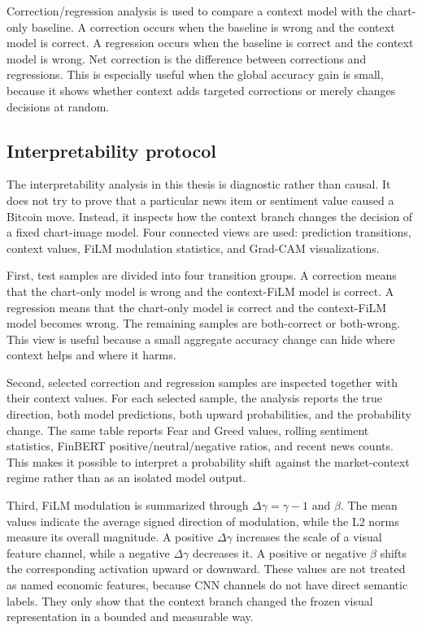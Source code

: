 \documentclass[14pt,a4paper]{extarticle}
\begin{document}
Correction/regression analysis is used to compare a context model with the chart-only baseline. A correction occurs when the baseline is wrong and the context model is correct. A regression occurs when the baseline is correct and the context model is wrong. Net correction is the difference between corrections and regressions. This is especially useful when the global accuracy gain is small, because it shows whether context adds targeted corrections or merely changes decisions at random.

\clearpage
\subsection{Interpretability protocol}

The interpretability analysis in this thesis is diagnostic rather than causal. It does not try to prove that a particular news item or sentiment value caused a Bitcoin move. Instead, it inspects how the context branch changes the decision of a fixed chart-image model. Four connected views are used: prediction transitions, context values, FiLM modulation statistics, and Grad-CAM visualizations.

First, test samples are divided into four transition groups. A correction means that the chart-only model is wrong and the context-FiLM model is correct. A regression means that the chart-only model is correct and the context-FiLM model becomes wrong. The remaining samples are both-correct or both-wrong. This view is useful because a small aggregate accuracy change can hide where context helps and where it harms.

Second, selected correction and regression samples are inspected together with their context values. For each selected sample, the analysis reports the true direction, both model predictions, both upward probabilities, and the probability change. The same table reports Fear and Greed values, rolling sentiment statistics, FinBERT positive/neutral/negative ratios, and recent news counts. This makes it possible to interpret a probability shift against the market-context regime rather than as an isolated model output.

Third, FiLM modulation is summarized through $\Delta\gamma=\gamma-1$ and $\beta$. The mean values indicate the average signed direction of modulation, while the L2 norms measure its overall magnitude. A positive $\Delta\gamma$ increases the scale of a visual feature channel, while a negative $\Delta\gamma$ decreases it. A positive or negative $\beta$ shifts the corresponding activation upward or downward. These values are not treated as named economic features, because CNN channels do not have direct semantic labels. They only show that the context branch changed the frozen visual representation in a bounded and measurable way.
\end{document}
